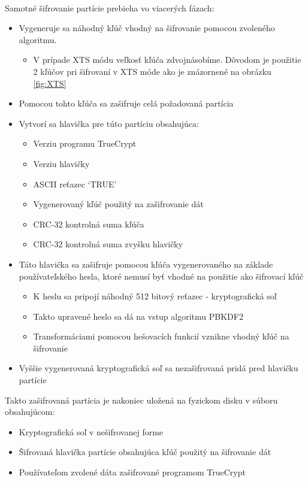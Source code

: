 \paragraph{}
Samotné šifrovanie partície prebieha vo viacerých fázach: 
\begin{itemize}
	\item Vygeneruje sa náhodný kľúč vhodný na šifrovanie pomocou zvoleného algoritmu. 
	\begin{itemize}
		\item V prípade XTS módu veľkosť kľúča zdvojnásobíme. Dôvodom je použitie 2 kľúčov pri šifrovaní v XTS móde ako je znázornené na obrázku \ref{fig:XTS}
	\end{itemize}
	\item Pomocou tohto kľúča sa zašifruje celá požadovaná partícia
	\item Vytvorí sa hlavička pre túto partíciu obsahujúca:
	\begin{itemize}
		\item Verziu programu TrueCrypt
		\item Verziu hlavičky
		\item ASCII reťazec `TRUE'
		\item Vygenerovaný kľúč použitý na zašifrovanie dát
		\item CRC-32 kontrolná suma kľúča
		\item CRC-32 kontrolná suma zvyšku hlavičky
	\end{itemize}
	\item Táto hlavička sa zašifruje pomocou kľúča vygenerovaného na základe používateľského hesla, ktoré nemusí byť vhodné na použitie ako šifrovací kľúč
	\begin{itemize}
		\item K heslu sa pripojí náhodný 512 bitový reťazec - kryptografická soľ
		\item Takto upravené heslo sa dá na vstup algoritmu PBKDF2
		\item Transformáciami pomocou hešovacích funkcií vznikne vhodný kľúč na šifrovanie
	\end{itemize}
	\item Vyššie vygenerovaná kryptografická soľ sa nezašifrovaná pridá pred hlavičku partície
\end{itemize}
Takto zašifrovaná partícia je nakoniec uložená na fyzickom disku v súboru obsahujúcom:
\begin{itemize}
	\item Kryptografická soľ v nešifrovanej forme
	\item Šifrovaná hlavička partície obsahujúca kľúč použitý na šifrovanie dát
	\item Používateľom zvolené dáta zašifrované programom TrueCrypt
\end{itemize}

